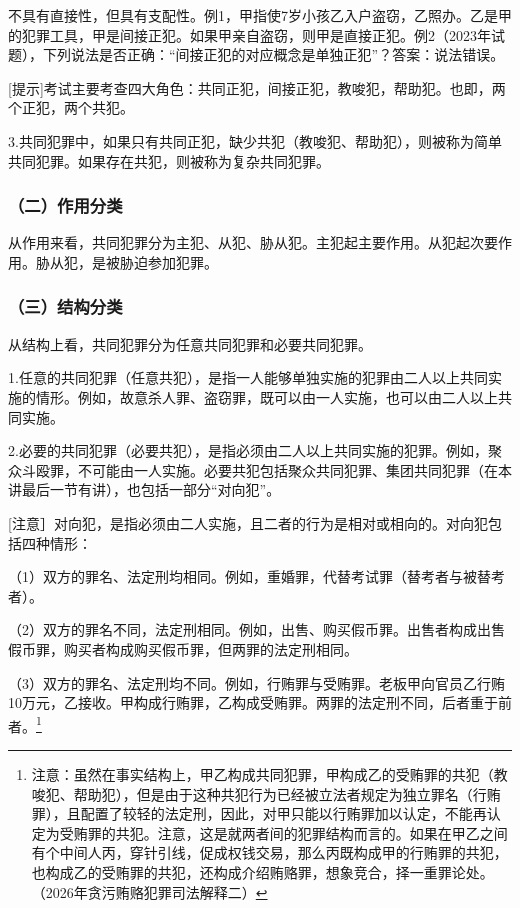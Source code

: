 不具有直接性，但具有支配性。例1，甲指使7岁小孩乙入户盗窃，乙照办。乙是甲的犯罪工具，甲是间接正犯。如果甲亲自盗窃，则甲是直接正犯。例2（2023年试题），下列说法是否正确：“间接正犯的对应概念是单独正犯”？答案：说法错误。

[提示]考试主要考查四大角色：共同正犯，间接正犯，教唆犯，帮助犯。也即，两个正犯，两个共犯。

3.共同犯罪中，如果只有共同正犯，缺少共犯（教唆犯、帮助犯），则被称为简单共同犯罪。如果存在共犯，则被称为复杂共同犯罪。


\subsubsection*{（二）作用分类}

从作用来看，共同犯罪分为主犯、从犯、胁从犯。主犯起主要作用。从犯起次要作用。胁从犯，是被胁迫参加犯罪。

\subsubsection*{（三）结构分类}

从结构上看，共同犯罪分为任意共同犯罪和必要共同犯罪。

1.任意的共同犯罪（任意共犯），是指一人能够单独实施的犯罪由二人以上共同实施的情形。例如，故意杀人罪、盗窃罪，既可以由一人实施，也可以由二人以上共同实施。

2.必要的共同犯罪（必要共犯），是指必须由二人以上共同实施的犯罪。例如，聚众斗殴罪，不可能由一人实施。必要共犯包括聚众共同犯罪、集团共同犯罪（在本讲最后一节有讲），也包括一部分“对向犯”。

[注意］对向犯，是指必须由二人实施，且二者的行为是相对或相向的。对向犯包括四种情形：

（1）双方的罪名、法定刑均相同。例如，重婚罪，代替考试罪（替考者与被替考者）。

（2）双方的罪名不同，法定刑相同。例如，出售、购买假币罪。出售者构成出售假币罪，购买者构成购买假币罪，但两罪的法定刑相同。

（3）双方的罪名、法定刑均不同。例如，行贿罪与受贿罪。老板甲向官员乙行贿10万元，乙接收。甲构成行贿罪，乙构成受贿罪。两罪的法定刑不同，后者重于前者。\footnote{注意：虽然在事实结构上，甲乙构成共同犯罪，甲构成乙的受贿罪的共犯（教唆犯、帮助犯），但是由于这种共犯行为已经被立法者规定为独立罪名（行贿罪），且配置了较轻的法定刑，因此，对甲只能以行贿罪加以认定，不能再认定为受贿罪的共犯。注意，这是就两者间的犯罪结构而言的。如果在甲乙之间有个中间人丙，穿针引线，促成权钱交易，那么丙既构成甲的行贿罪的共犯，也构成乙的受贿罪的共犯，还构成介绍贿赂罪，想象竞合，择一重罪论处。（2026年贪污贿赂犯罪司法解释二）}

